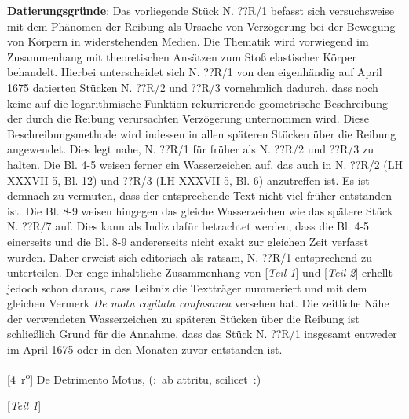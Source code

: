 \vspace*{5mm}
\begin{ledgroup}
\footnotesize 
\pstart
\noindent\footnotesize{\textbf{Datierungsgr\"{u}nde}: Das vorliegende St\"{u}ck N. ??R/1 befasst sich versuchsweise mit dem Ph\"{a}nomen der Reibung als Ursache von Verz\"{o}gerung bei der Bewegung von K\"{o}rpern in widerstehenden Medien. Die Thematik wird vorwiegend im Zusammenhang mit theoretischen Ans\"{a}tzen zum Sto{\ss} elastischer K\"{o}rper behandelt. Hierbei unterscheidet sich N. ??R/1 von den eigenh\"{a}ndig auf April 1675 datierten St\"{u}cken N. ??R/2 und ??R/3 vornehmlich dadurch, dass noch keine auf die logarithmische Funktion rekurrierende geometrische Beschreibung der durch die Reibung verursachten Verz\"{o}gerung unternommen wird. Diese Beschreibungsmethode wird indessen in allen sp\"{a}teren St\"{u}cken \"{u}ber die Reibung angewendet. Dies legt nahe, N. ??R/1 f\"{u}r fr\"{u}her als N. ??R/2 und ??R/3 zu halten. Die Bl. 4-5 weisen ferner ein Wasserzeichen auf, das auch in N. ??R/2 (LH XXXVII 5, Bl. 12) und ??R/3 (LH XXXVII 5, Bl. 6) anzutreffen ist. Es ist demnach zu vermuten, dass der entsprechende Text nicht viel fr\"{u}her entstanden ist. Die Bl. 8-9 weisen hingegen das gleiche Wasserzeichen wie das sp\"{a}tere St\"{u}ck N. ??R/7 auf. Dies kann als Indiz daf\"{u}r betrachtet werden, dass die Bl. 4-5 einerseits und die Bl. 8-9 andererseits nicht exakt zur gleichen Zeit verfasst wurden. Daher erweist sich editorisch als ratsam, N. ??R/1 entsprechend zu unterteilen. Der enge inhaltliche Zusammenhang von [\textit{Teil 1}] und [\textit{Teil 2}] erhellt jedoch schon daraus, dass Leibniz die Texttr\"{a}ger nummeriert und mit dem gleichen Vermerk \textit{De motu cogitata confusanea} versehen hat. Die zeitliche N\"{a}he der verwendeten Wasserzeichen zu sp\"{a}teren St\"{u}cken \"{u}ber die Reibung ist schlie{\ss}lich Grund f\"{u}r die Annahme, dass das St\"{u}ck N. ??R/1 insgesamt entweder im April 1675 oder in den Monaten zuvor entstanden ist.}
\pend
\end{ledgroup}

\vspace*{8mm}
\newpage
\pstart
\begin{center}
 [4~r\textsuperscript{o}] De Detrimento Motus\protect{}, (:~ab attritu\protect{}, scilicet~:)
 \end{center}
 \pend
 \pstart
\vspace{0,5em}
\begin{center}
 [\textit{Teil 1}] 
\end{center}
\pend
 

